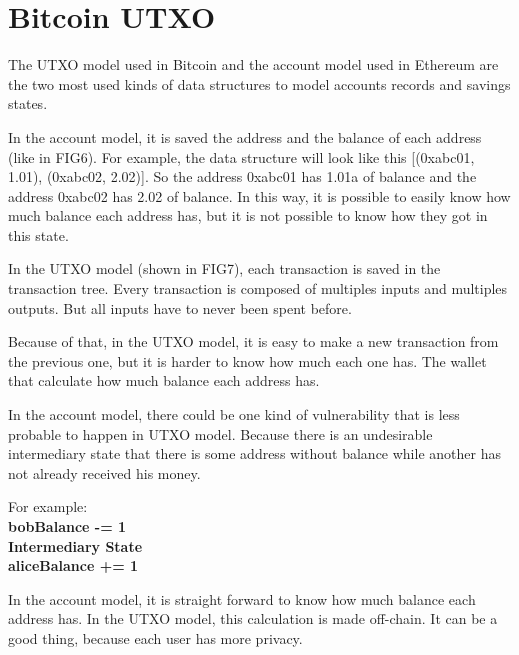 \section{Bitcoin UTXO}

The UTXO model used in Bitcoin and the account model used in Ethereum are the two most used kinds
of data structures to model accounts records and savings states.


In the account model, it is saved the address and the balance of each address
(like in FIG6).
For example, the data structure will look like this [(0xabc01, 1.01), (0xabc02, 2.02)].
So the address 0xabc01 has 1.01a of balance and the address 0xabc02 has 2.02 of balance.
In this way, it is possible to easily know how much balance each address has,
but it is not possible to know how they got in this state.


In the UTXO model (shown in FIG7), each transaction is saved in the transaction tree.
Every transaction is composed of multiples inputs and multiples outputs.
But all inputs have to never been spent before.

Because of that, in the UTXO model, it is easy to make a new transaction from the previous one,
but it is harder to know how much each one has.
The wallet that calculate how much balance each address has.

In the account model, there could be one kind of vulnerability that is less probable to happen in UTXO
model.
Because there is an undesirable intermediary state that there is some address without balance while
another has not already received his money.

For example: \\
\textbf{
bobBalance -= 1 \\
Intermediary State \\
aliceBalance += 1
}

In the account model, it is straight forward to know how much balance each address has.
In the UTXO model, this calculation is made off-chain. It can be a good thing,
because each user has more privacy.
